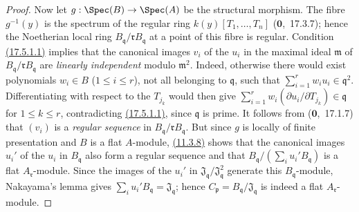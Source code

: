 \begin{proof}
Now let $g:\Spec(B)\to\Spec(A)$ be the structural morphism.
The fibre $g^{-1}(y)$ is the spectrum of the regular ring $k(y)[T_1,\ldots,T_n]$ ($\mathbf{0}$,~17.3.7); hence the Noetherian local ring $B_\mathfrak{q}/\mathfrak{r}B_\mathfrak{q}$ at a point of this fibre is regular.
Condition {\hyperlink{ega4.c04.eq.17-5-1-1}{(17.5.1.1)}} implies that the canonical images $v_i$ of the $u_i$ in the maximal ideal $\mathfrak{m}$ of $B_\mathfrak{q}/\mathfrak{r}B_\mathfrak{q}$ are \emph{linearly independent} modulo $\mathfrak{m}^2$.
Indeed, otherwise there would exist polynomials $w_i\in B$ ($1\leqslant i\leqslant r$), not all belonging to $\mathfrak{q}$, such that $\sum_{i=1}^r w_i u_i\in\mathfrak{q}^2$.
Differentiating with respect to the $T_{j_k}$ would then give $\sum_{i=1}^r w_i(\partial u_i/\partial T_{j_k})\in\mathfrak{q}$ for $1\leqslant k\leqslant r$, contradicting {\hyperlink{ega4.c04.eq.17-5-1-1}{(17.5.1.1)}}, since $\mathfrak{q}$ is prime.
It follows from ($\mathbf{0}$,~17.1.7) that $(v_i)$ is a \emph{regular sequence} in $B_\mathfrak{q}/\mathfrak{r}B_\mathfrak{q}$.
But since $g$ is locally of finite presentation and $B$ is a flat $A$-module, {\hyperlink{ega4.c04.thm.11-3-8}{(11.3.8)}} shows that the canonical images $u_i'$ of the $u_i$ in $B_\mathfrak{q}$ also form a regular sequence and that $B_\mathfrak{q}/(\sum_i u_i'B_\mathfrak{q})$ is a flat $A_\mathfrak{r}$-module.
Since the images of the $u_i'$ in $\mathfrak{J}_\mathfrak{q}/\mathfrak{J}_\mathfrak{q}^2$ generate this $B_\mathfrak{q}$-module, Nakayama's lemma gives $\sum_i u_i'B_\mathfrak{q}=\mathfrak{J}_\mathfrak{q}$; hence $C_\mathfrak{p}=B_\mathfrak{q}/\mathfrak{J}_\mathfrak{q}$ is indeed a flat $A_\mathfrak{r}$-module.


\end{proof}
